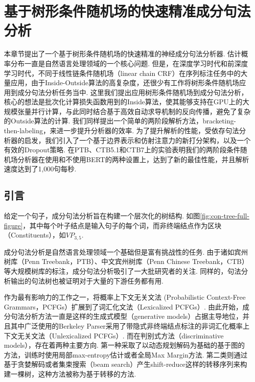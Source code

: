 \chapter{基于树形条件随机场的快速精准成分句法分析}
\label{cha:con-crf}

本章节提出了一个基于树形条件随机场的快速精准的神经成分句法分析器.
估计概率分布一直是自然语言处理领域的一个核心问题.
但是，在深度学习时代和前深度学习时代，不同于线性链条件随机场（linear chain CRF）在序列标注任务中的大量应用，由于Inside-Outside算法的高复杂度，还很少有工作将树形条件随机场应用到成分句法分析任务当中.
这里我们提出应用树形条件随机场到成分句法分析，核心的想法是批次化计算损失函数用到的Inside算法，使其能够支持在GPU上的大规模张量并行计算，与此同时结合基于高效自动求导机制的反向传播，避免了复杂的Outside算法的计算.
我们同样提出一个简单的两阶段解析方法，bracketing-then-labeling，来进一步提升分析器的效率.
为了提升解析的性能，受依存句法分析器的启发，我们引入了一个基于边界表示和仿射注意力的新打分架构，以及一个有效的Dropout策略.
在PTB、CTB5.1和CTB7上的实验表明我们的两阶段条件随机场分析器在使用和不使用BERT的两种设置上，达到了新的最佳性能，并且解析速度达到了1,000句每秒.

\section{引言}\label{sec:con-intro}


给定一个句子，成分句法分析旨在构建一个层次化的树结构. 如图\ref{fig:con-tree-full-figure}，其中每个叶子结点是输入句子的每个词，而非终端结点作为区块（Constituents），如\texttt{$VP_{3,5}$}.

成分句法分析是自然语言处理领域一个基础但是富有挑战性的任务.
由于诸如宾州树库（Penn Treebank，PTB）、中文宾州树库（Penn Chinese Treebank，CTB）等大规模树库的标注，成分句法分析吸引了一大批研究者的关注.
同样的，句法分析输出的句法树也被证明对于大量的下游任务\citep{akoury-etal-2019-syntactically,wang-etal-2018-tree}都有用.

作为最有影响力的工作之一，\cite{collins-1997-three}将概率上下文无关文法 (Probabilistic Context-Free Grammars，PCFGs）扩展到了词汇化文法（Lexicalized PCFGs）.
由此开始，成分句法分析方法一直是这样的生成式模型（generative models）占据主导地位，并且其中广泛使用的Berkeley Parser采用了带隐式非终端结点标注的非词汇化概率上下文无关文法（Unlexicalized PCFGs）\citep{matsuzaki-etal-2005-probabilistic,petrov-klein-2007-improved}.
而在判别式方法（discriminative models），存在着两种主要方向.
第一种采取了以动态规划解码为基础的基于图的方法，训练时使用局部max-entropy估计\citep{kaplan-etal-2004-speed}或者全局Max Margin方法\citep{taskar-etal-2004-max}.
第二类则通过基于贪婪解码或者集束搜索（beam search）产生shift-reduce这样的转移序列来构建一棵树，这种方法被称为基于转移的方法\citep{sagae-lavie-2005-classifier,zhu-etal-2013-fast}.


